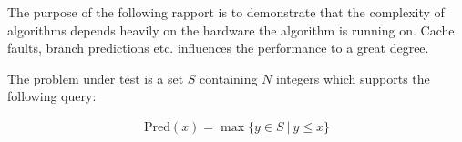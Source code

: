The purpose of the following rapport is to demonstrate that the complexity of algorithms depends heavily on the hardware the algorithm is running on. Cache faults, branch predictions etc. influences the performance to a great degree.

The problem under test is a set $S$ containing $N$ integers which supports the following query:

\begin{eqnarray*}
\mathrm{Pred}(x) = \max \{ y \in S\ |\ y \leq x \}
\end{eqnarray*}